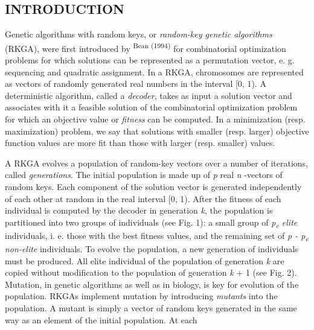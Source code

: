 \vspace*{-1.6mm}
{\noindent\fontsize{9}{10.8}\selectfont{Received: 03/06/2014;
Accepted: 14/06/2014.}}
\begin{multicols}{2}
\section*{INTRODUCTION}
\par{}Genetic algorithms with random keys,\allowbreak{} or \textit{random-\allowbreak{}key genetic algorithms} (\allowbreak{}RKGA)\allowbreak{},\allowbreak{} were first introduced by \textsuperscript{Bean (\allowbreak{}1994)\allowbreak{}} for combinatorial optimization problems for which solutions can be represented as a permutation vector,\allowbreak{} e.\allowbreak{} g.\allowbreak{} sequencing and quadratic assignment.\allowbreak{} In a RKGA,\allowbreak{} chromosomes are represented as vectors of randomly generated real numbers in the interval [0,\allowbreak{} 1)\allowbreak{}.\allowbreak{} A deterministic algorithm,\allowbreak{} called a \textit{decoder},\allowbreak{} takes as input a solution vector and associates with it a feasible solution of the combinatorial optimization problem for which an objective value or \textit{fitness} can be computed.\allowbreak{} In a minimization (\allowbreak{}resp.\allowbreak{} maximization)\allowbreak{} problem,\allowbreak{} we say that solutions with smaller (\allowbreak{}resp.\allowbreak{} larger)\allowbreak{} objective function values are more fit than those with larger (\allowbreak{}resp.\allowbreak{} smaller)\allowbreak{} values.\allowbreak{}\par{}A RKGA evolves a population of random-\allowbreak{}key vectors over a number of iterations,\allowbreak{} called \textit{generations}.\allowbreak{} The initial population is made up of \textit{p} real \textit{n} -\allowbreak{}vectors of random keys.\allowbreak{} Each component of the solution vector is generated independently of each other at random in the real interval [0,\allowbreak{} 1)\allowbreak{}.\allowbreak{} After the fitness of each individual is computed by the decoder in generation \textit{k},\allowbreak{} the population is partitioned into two groups of individuals (\allowbreak{}see Fig.\allowbreak{} 1)\allowbreak{}:\allowbreak{} a small group of \textit{p\textsubscript{e} elite} individuals,\allowbreak{} i.\allowbreak{} e.\allowbreak{} those with the best fitness values,\allowbreak{} and the remaining set of \textit{p -\allowbreak{} p\textsubscript{e} non-\allowbreak{}elite} individuals.\allowbreak{} To evolve the population,\allowbreak{} a new generation of individuals must be produced.\allowbreak{} All elite individual of the population of generation \textit{k} are copied without modification to the population of generation \textit{k} +\allowbreak{} 1 (\allowbreak{}see Fig.\allowbreak{} 2)\allowbreak{}.\allowbreak{} Mutation,\allowbreak{} in genetic algorithms as well as in biology,\allowbreak{} is key for evolution of the population.\allowbreak{} RKGAs implement mutation by introducing \textit{mutants} into the population.\allowbreak{} A mutant is simply a vector of random keys generated in the same way as an element of the initial population.\allowbreak{} At each 
\end{multicols}
